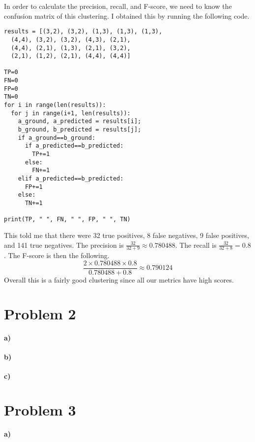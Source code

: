 \documentclass[12pt]{article}
\begin{document}
In order to calculate the precision, recall, and F-score, we need to know the confusion matrix of this clustering.
I obtained this by running the following code.
\begin{verbatim}
results = [(3,2), (3,2), (1,3), (1,3), (1,3),
  (4,4), (3,2), (3,2), (4,3), (2,1),
  (4,4), (2,1), (1,3), (2,1), (3,2),
  (2,1), (1,2), (2,1), (4,4), (4,4)]

TP=0
FN=0
FP=0
TN=0
for i in range(len(results)):
  for j in range(i+1, len(results)):
    a_ground, a_predicted = results[i];
    b_ground, b_predicted = results[j];
    if a_ground==b_ground:
      if a_predicted==b_predicted:
        TP+=1
      else:
        FN+=1
    elif a_predicted==b_predicted:
      FP+=1
    else:
      TN+=1

print(TP, " ", FN, " ", FP, " ", TN)
\end{verbatim}
This told me that there were 32 true positives, 8 false negatives, 9 false positives, and 141 true negatives.
The precision is \(\frac{32}{32+9}\approx0.780488\). The recall is \(\frac{32}{32+8}=0.8\). The F-score is then
the following.
\[\frac{2\times0.780488\times0.8}{0.780488+0.8}\approx0.790124\]
Overall this is a fairly good clustering since all our metrics have high scores.

\section*{Problem 2}

\paragraph{a)}

\paragraph{b)}

\paragraph{c)}

\section*{Problem 3}

\paragraph{a)}
\end{document}

